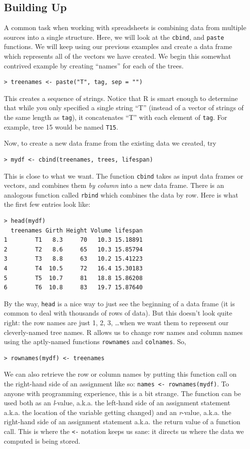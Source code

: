 \documentclass[12pt]{article}
\begin{document}
\subsection{Building Up}
A common task when working with spreadsheets is combining data from multiple sources into a single structure. Here, we will look at the \verb|cbind|, and \verb|paste| functions. We will keep using our previous examples and create a data frame which represents all of the vectors we have created. We begin this somewhat contrived example by creating ``names'' for each of the trees.

\begin{verbatim}
> treenames <- paste("T", tag, sep = "")
\end{verbatim}

This creates a sequence of strings. Notice that R is smart enough to determine that while you only specified a single string ``T'' (instead of a vector of strings of the same length as \verb|tag|), it concatenates ``T'' with each element of \verb|tag|. For example, tree 15 would be named \verb|T15|.

Now, to create a new data frame from the existing data we created, try
\begin{verbatim}
> mydf <- cbind(treenames, trees, lifespan)
\end{verbatim}
This is close to what we want. The function \verb|cbind| takes as input data frames or vectors, and combines them \emph{by column} into a new data frame. There is an analogous function called \verb|rbind| which combines the data by row. Here is what the first few entries look like:

\begin{Verbatim}[frame=single, fontsize=\small]
> head(mydf)
  treenames Girth Height Volume lifespan
1        T1   8.3     70   10.3 15.18891
2        T2   8.6     65   10.3 15.85794
3        T3   8.8     63   10.2 15.41223
4        T4  10.5     72   16.4 15.30183
5        T5  10.7     81   18.8 15.86208
6        T6  10.8     83   19.7 15.87640
\end{Verbatim}
By the way, \verb|head| is a nice way to just see the beginning of a data frame (it is common to deal with thousands of rows of data). But this doesn't look quite right: the row names are just 1, 2, 3, \dots when we want them to represent our cleverly-named tree names. R allows us to change row names and column names using the aptly-named functions \verb|rownames| and \verb|colnames|. So,
\begin{verbatim}
> rownames(mydf) <- treenames
\end{verbatim}
We can also retrieve the row or column names by putting this function call on the right-hand side of an assignment like so: \verb|names <- rownames(mydf)|. To anyone with programming experience, this is a bit strange. The function can be used both as an \emph{l}-value, a.k.a. the left-hand side of an assignment statement a.k.a. the location of the variable getting changed) and an \emph{r}-value, a.k.a. the right-hand side of an assignment statement a.k.a. the return value of a function call. This is where the \verb|<-| notation keeps us sane: it directs us where the data we computed is being stored.
\end{document}
